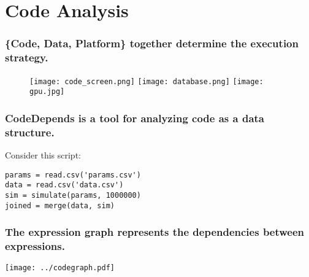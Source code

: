 \documentclass{beamer}
\begin{document}
\section{Code Analysis}
\begin{frame}

    \frametitle{\{Code, Data, Platform\} together determine the execution
    strategy.}

\begin{figure}
            \texttt{[image: code\_screen.png]}
            \hfill
            \texttt{[image: database.png]}
            \hfill
            \texttt{[image: gpu.jpg]}
\end{figure}


\end{frame}
\begin{frame}[fragile]

    \frametitle{CodeDepends is a tool for analyzing code as a data
    structure.}


    Consider this script:

\begin{verbatim}
params = read.csv('params.csv')
data = read.csv('data.csv')
sim = simulate(params, 1000000)
joined = merge(data, sim)
\end{verbatim}

\end{frame}
\begin{frame}

    \frametitle{The expression graph represents the dependencies between
    expressions.}

    \centerline{\texttt{[image: ../codegraph.pdf]}}

\end{frame}
\end{document}
